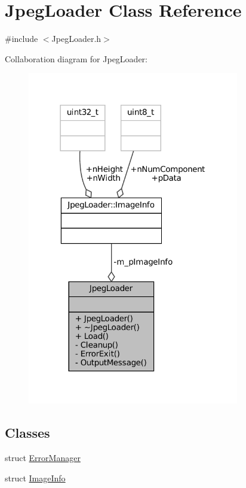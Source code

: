 \hypertarget{classJpegLoader}{}\section{Jpeg\+Loader Class Reference}
\label{classJpegLoader}


{\ttfamily \#include $<$Jpeg\+Loader.\+h$>$}



Collaboration diagram for Jpeg\+Loader\+:
\nopagebreak
\begin{figure}[H]
\begin{center}
\leavevmode
\includegraphics[width=262pt]{classJpegLoader__coll__graph}
\end{center}
\end{figure}
\subsection*{Classes}
\begin{DoxyCompactItemize}
\item 
struct \mbox{\hyperlink{structJpegLoader_1_1ErrorManager}{Error\+Manager}}
\item 
struct \mbox{\hyperlink{structJpegLoader_1_1ImageInfo}{Image\+Info}}
\end{DoxyCompactItemize}
